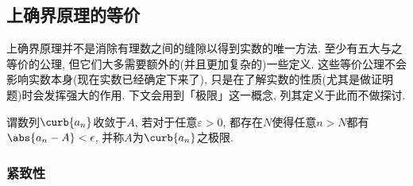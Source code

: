 \documentclass[hidelinks]{ctexart}
\begin{document}

\subsection{上确界原理的等价} %
\label{sub:上确界原理的等价}

上确界原理并不是消除有理数之间的缝隙以得到实数的唯一方法. 至少有五大与之等价的公理, 但它们大多需要额外的(并且更加复杂的)一些定义. 这些等价公理不会影响实数本身(现在实数已经确定下来了), 只是在了解实数的性质(尤其是做证明题)时会发挥强大的作用. 下文会用到「极限」这一概念, 列其定义于此而不做探讨.
\begin{definition}[极限]
    \label{def:极限}
    谓数列$\curb{a_n}$收敛于$A$, 若对于任意$\varepsilon > 0$, 都存在$N$使得任意$n>N$都有$\abs{a_n-A} < \epsilon$, 并称$A$为$\curb{a_n}$之极限.
\end{definition}

\subsubsection{紧致性} %
\label{ssub:紧致性}
\end{document}
